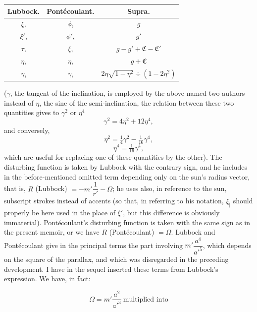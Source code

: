 \documentclass[12pt,a4paper]{article}
\theoremstyle{plain}
\begin{document}
\newpage
{}

\begin{center}
\begin{tabular}{|c|c|c|}
\hline
Lubbock. & Pont\'ecoulant. & Supra. \\
\hline
$\xi$,    & $\phi$,         & $g$ \\
$\xi'$,   & $\phi'$,        & $g'$ \\
$\tau$,   & $\xi$,          & $g-g'+\mathfrak{C}-\mathfrak{C}'$ \\
$\eta$,   & $\eta$,         & $g+\mathfrak{C}$ \\
$\gamma$,& $\gamma$,        & $2\eta\sqrt{1-\eta^{2}}\div(1-2\eta^{2})$ \\
\hline
\end{tabular}
\end{center}

\noindent($\gamma$, the tangent of the inclination, is employed by the above-named two authors instead of $\eta$, the sine of the semi-inclination, the relation between these two quantities gives to $\gamma^{2}$ or $\eta^{4}$
\[
\gamma^{2}=4\eta^{2}+12\eta^{4},
\]
and conversely,
\[
\eta^{2}=\tfrac{1}{4}\gamma^{2}-\tfrac{1}{16}\gamma^{4},
\]
\[
\eta^{4}=\tfrac{1}{16}\gamma^{4},
\]
which are useful for replacing one of these quantities by the other). The disturbing function is taken by Lubbock with the contrary sign, and he includes in the before-mentioned omitted term depending only on the sun's radius vector, that is, $R$ (Lubbock) $=-m'\dfrac{1}{r'}-\Omega$; he uses also, in reference to the sun, subscript strokes instead of accents (so that, in referring to his notation, $\xi_{|}$ should properly be here used in the place of $\xi'$, but this difference is obviously immaterial). Pont\'ecoulant's disturbing function is taken with the same sign as in the present memoir, or we have $R$ (Pont\'ecoulant) $=\Omega$. Lubbock and Pont\'ecoulant give in the principal terms the part involving $m'\dfrac{a^{4}}{a'^{5}}$, which depends on the square of the parallax, and which was disregarded in the preceding development. I have in the sequel inserted these terms from Lubbock's expression. We have, in fact:

\newpage
{}
\[
\Omega=m'\frac{a^{2}}{a'^{3}}\ \text{multiplied into}
\]
\end{document}
